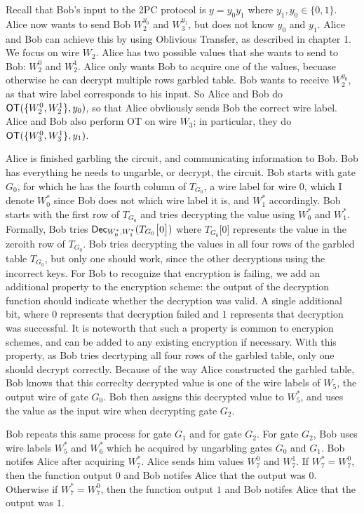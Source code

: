 Recall that Bob's input to the 2PC protocol is $y = y_0 y_1$ where $y_1, y_0 \in \{0,1\}$.
Alice now wants to send Bob $W_2^{y_0}$ and $W_3^{y_1}$, but does not know $y_0$ and $y_1$.
Alice and Bob can achieve this by using Oblivious Transfer, as described in chapter 1.
We focus on wire $W_2$.
Alice has two possible values that she wants to send to Bob: $W_2^0$ and $W_2^1$.
Alice only wants Bob to acquire one of the values, becuase otherwise he can decrypt multiple rows garbled table.
Bob wants to receive $W_2^{y_0}$, as that wire label corresponds to his input.
So Alice and Bob do $\textsf{OT}(\{W_2^0, W_2^1\}, y_0)$, so that Alice obvliously sends Bob the correct wire label.
Alice and Bob also perform OT on wire $W_3$; in particular, they do $\textsf{OT}(\{W_3^0, W_3^1\}, y_1)$.

Alice is finished garbling the circuit, and communicating information to Bob. 
Bob has everything he needs to ungarble, or decrypt, the circuit.
Bob starts with gate $G_0$, for which he has the fourth column of $T_{G_0}$, a wire label for wire $0$, which I denote $W_0^*$ since Bob does not which wire label it is, and $W_1^*$ accordingly.
Bob starts with the first row of $T_{G_0}$ and tries decrypting the value using $W_0^*$ and $W_1^*$.
Formally, Bob tries $\textsf{Dec}_{W_0^*, W_1^*}(T_{G_0}\big[0\big])$ where $T_{G_0}\big[0\big]$ represents the value in the zeroith row of $T_{G_0}$.
Bob tries decrypting the values in all four rows of the garbled table $T_{G_0}$, but only one should work, since the other decryptions using the incorrect keys.
For Bob to recognize that encryption is failing, we add an additional property to the encryption scheme: the output of the decryption function should indicate whether the decryption was valid.
A single additional bit, where $0$ represents that decryption failed and $1$ represents that decryption was successful. 
It is noteworth that such a property is common to encrypion schemes, and can be added to any existing encryption if necessary.
With this property, as Bob tries decrtyping all four rows of the garbled table, only one should decrypt correctly.
Because of the way Alice constructed the garbled table, Bob knows that this correclty decrypted value is one of the wire labels of $W_5$, the output wire of gate $G_0$.
Bob then assigns this decrypted value to $W_5^*$, and uses the value as the input wire when decrypting gate $G_2$.

Bob repeats this same process for gate $G_1$ and for gate $G_2$.
For gate $G_2$, Bob uses wire labels $W_5^*$ and $W_6^*$ which he acquired by ungarbling gates $G_0$ and $G_1$.
Bob notifes Alice after acquiring $W_7^*$.
Alice sends him values $W_7^0$ and $W_7^1$.
If $W_7^* = W_7^0$, then the function output $0$ and Bob notifes Alice that the output was $0$.
Otherwise if $W_7^* = W_7^0$, then the function output $1$ and Bob notifes Alice that the output was $1$.

